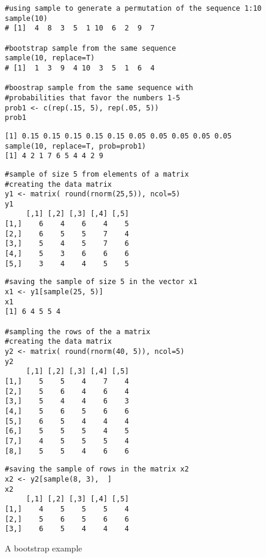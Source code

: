 \documentclass[12pt]{article}
\begin{document}
\begin{framed}
\begin{verbatim}
#using sample to generate a permutation of the sequence 1:10
sample(10)
# [1]  4  8  3  5  1 10  6  2  9  7

#bootstrap sample from the same sequence
sample(10, replace=T)
# [1]  1  3  9  4 10  3  5  1  6  4

#boostrap sample from the same sequence with 
#probabilities that favor the numbers 1-5
prob1 <- c(rep(.15, 5), rep(.05, 5))
prob1
\end{verbatim}
\end{framed}
\begin{framed}
\begin{verbatim}
[1] 0.15 0.15 0.15 0.15 0.15 0.05 0.05 0.05 0.05 0.05
sample(10, replace=T, prob=prob1)
[1] 4 2 1 7 6 5 4 4 2 9
\end{verbatim}
\end{framed}
\begin{framed}
\begin{verbatim}
#sample of size 5 from elements of a matrix 
#creating the data matrix
y1 <- matrix( round(rnorm(25,5)), ncol=5)
y1
     [,1] [,2] [,3] [,4] [,5] 
[1,]    6    4    6    4    5
[2,]    6    5    5    7    4
[3,]    5    4    5    7    6
[4,]    5    3    6    6    6
[5,]    3    4    4    5    5
\end{verbatim}
\end{framed}
\begin{framed}
\begin{verbatim}
#saving the sample of size 5 in the vector x1
x1 <- y1[sample(25, 5)]
x1
[1] 6 4 5 5 4

#sampling the rows of the a matrix
#creating the data matrix
y2 <- matrix( round(rnorm(40, 5)), ncol=5)
y2
     [,1] [,2] [,3] [,4] [,5] 
[1,]    5    5    4    7    4
[2,]    5    6    4    6    4
[3,]    5    4    4    6    3
[4,]    5    6    5    6    6
[5,]    6    5    4    4    4
[6,]    5    5    5    4    5
[7,]    4    5    5    5    4
[8,]    5    5    4    6    6
\end{verbatim}
\end{framed}
\begin{framed}
\begin{verbatim}
#saving the sample of rows in the matrix x2
x2 <- y2[sample(8, 3),  ]
x2
     [,1] [,2] [,3] [,4] [,5] 
[1,]    4    5    5    5    4
[2,]    5    6    5    6    6
[3,]    6    5    4    4    4
\end{verbatim}
\end{framed}
A bootstrap example
\end{document}
